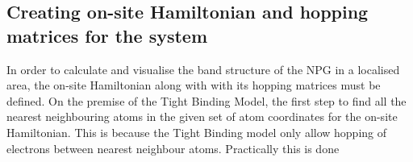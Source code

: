 \subsection{Creating on-site Hamiltonian and hopping matrices for the system}
In order to calculate and visualise the band structure of the NPG in a localised area, the on-site Hamiltonian along with with its hopping matrices must be defined. On the premise of the Tight Binding Model, the first step to find all the nearest neighbouring atoms in the given set of atom coordinates for the on-site Hamiltonian. This is because the Tight Binding model only allow hopping of electrons between nearest neighbour atoms. Practically this is done 
